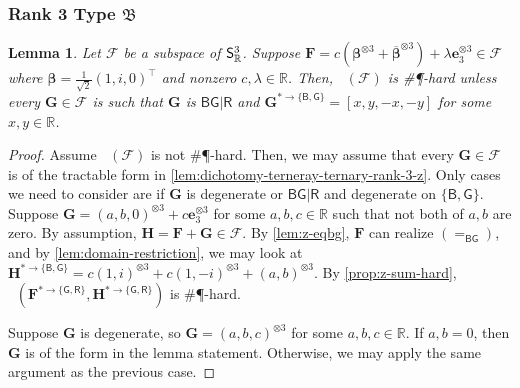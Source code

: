 \documentclass[11pt]{article}
\newtheorem{lemma}[theorem]{Lemma}
\DeclareMathOperator{\holbs}{Holant^*_2}
\DeclareMathOperator{\holts}{Holant^*_3}
\newcommand{\db}{\mathsf{B}}
\newcommand{\dg}{\mathsf{G}}
\newcommand{\dr}{\mathsf{R}}
\newcommand{\sph}{\#\P-hard\xspace}
\newcommand{\teh}{^{\otimes 3}}
\newcommand{\transpose}{^\intercal}
\newcommand{\domres}[1]{
  ^{*\to\{#1\}}
}
\newcommand{\ternarytractz}{$\mathfrak{B}$\xspace}
\begin{document}
\subsubsection{Rank 3 Type \texorpdfstring{\ternarytractz}{B}}
\begin{lemma}\label{lem:dichotomy-subspace-rank-3-z}
  Let $\mathscr{F}$ be a subspace of $\mathsf{S}^3_{\mathbb{R}}$.
  Suppose $\mathbf{F} = c(\boldsymbol{\beta}\teh + \overline{\boldsymbol{\beta}}\teh ) + \lambda \mathbf{e}_3 \teh \in \mathscr{F}$ where $\boldsymbol{\beta} = \frac{1}{\sqrt{2}}(1, i, 0)\transpose$ and nonzero $c, \lambda \in \mathbb{R}$.
  Then, $\holts(\mathscr{F})$ is \sph unless every $\mathbf{G} \in \mathscr{F}$ is such that
  $\mathbf{G}$ is $\db \dg | \dr$ and $\mathbf{G}\domres{\db, \dg} = [x, y, -x, -y]$ for some $x, y \in \mathbb{R}$.
\end{lemma}
\begin{proof}
Assume $\holts(\mathscr{F})$ is not \sph.
  Then, we may assume that every $\mathbf{G} \in \mathscr{F}$ is of the tractable form in \cref{lem:dichotomy-terneray-ternary-rank-3-z}.
  Only cases we need to consider are if $\mathbf{G}$ is degenerate or $\db \dg | \dr$ and degenerate on $\{\db, \dg\}$.
  Suppose $\mathbf{G} = (a, b, 0)\teh + c \mathbf{e}_3 \teh$ for some $a, b, c \in \mathbb{R}$ such that not both of $a, b$ are zero.
  By assumption, $\mathbf{H} = \mathbf{F} + \mathbf{G} \in \mathscr{F}$.
  By \cref{lem:z-eqbg}, $\mathbf{F}$ can realize $(=_{\db \dg})$, and by \cref{lem:domain-restriction}, we may look at $\mathbf{H}\domres{\db, \dg} = c (1, i)\teh + c (1, -i)\teh + (a, b)\teh$.
  By \cref{prop:z-sum-hard}, $\holbs(\mathbf{F}\domres{\dg, \dr}, \mathbf{H}\domres{\dg, \dr})$ is \sph.

  Suppose $\mathbf{G}$ is degenerate, so $\mathbf{G} = (a, b, c)\teh$ for some $a, b, c \in \mathbb{R}$.
  If $a, b = 0$, then $\mathbf{G}$ is of the form in the lemma statement.
  Otherwise, we may apply the same argument as the previous case.
\end{proof}
\end{document}
